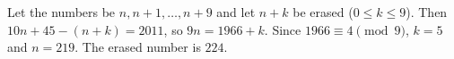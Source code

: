 Let the numbers be $n,n+1,\dots,n+9$ and let $n+k$ be erased ($0\le k\le9$). Then $10n+45-(n+k)=2011$, so $9n=1966+k$. Since $1966\equiv4\pmod9$, $k=5$ and $n=219$. The erased number is $\boxed{224}$.
